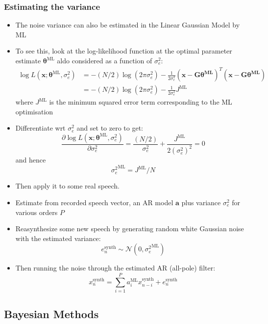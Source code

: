 \documentclass[12pt]{article}
\newcommand{\dydx}[2]{\frac{\partial{#1}}{\partial{#2}}}
\newcommand{\sigd}{\sigma^2}
\newcommand{\gau}{\mathcal{N}}
\newcommand{\thetab}{\boldsymbol{\theta}}
\newcommand{\xb}{\mathbf{x}}
\newcommand{\ml}{\textrm{ML}}
\begin{document}
\subsubsection{Estimating the variance}
\begin{itemize}
    \item The noise variance can also be estimated in the Linear Gaussian Model by ML
    \item To see this, look at the log-likelihood function at the optimal parameter estimate $\thetab^\ml$ aldo considered as a function of $\sigd_e$:
    \begin{align*}
        \log L(\xb;\thetab^\ml, \sigd_e) &= - (N/2) \log(2\pi\sigd_e) -\frac{1}{2\sigd_e}(\mathbf{x-G\thetab^\ml})^T(\mathbf{x-G\thetab^\ml})\\
        & = - (N/2) \log(2\pi\sigd_e) - \frac{1}{2\sigd_e}J^\ml
    \end{align*}
    where $J^\ml$ is the minimum squared error term corresponding to the ML optimisation
    \item Differentiate wrt $\sigd_e$ and set to zero to get:
    \[
    \dydx{\log L(\xb;\thetab^\ml, \sigd_e)}{\sigd_e} = \frac{(N/2)}{\sigd_e} + \frac{J^\ml}{2(\sigd_e)^2} = 0
    \]
    and hence 
    \[
    {\sigd_e}^\ml = J^\ml / N
    \]
    \item Then apply it to some real speech.
    \item Estimate from recorded speech vector, an AR model $\mathbf{a}$ plus variance $\sigd_e$ for various orders $P$
    \item Reasynthesize some new speech by generating random white Gaussian noise with the estimated variance:
    \[
    e_n^{\textrm{synth}} \sim \gau (0,{\sigd_e}^\ml)
    \]
    \item Then running the noise through the estimated AR (all-pole) filter:
    \[
    x_n^{\textrm{synth}} = \sum_{i=1}^P a_i^{\ml} x_{n-i}^{\textrm{synth}} + e_n^{\textrm{synth}}
    \]
\end{itemize}
\subsection{Bayesian Methods}
\end{document}
